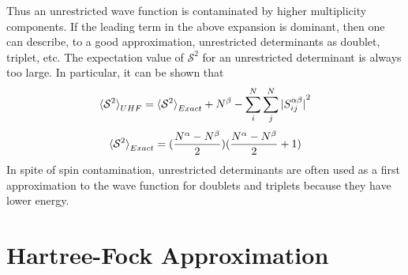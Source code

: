\documentclass[11pt]{article}
\begin{document}
Thus an unrestricted wave function is contaminated by higher multiplicity components. If the leading term in the above expansion is dominant, then
one can describe, to a good approximation, unrestricted determinants as doublet, triplet, etc. The expectation value of $\mathcal{S}^2$ for an unrestricted
determinant is always too large. In particular, it can be shown that
\begin{equation}
    \braket{\mathcal{S}^2}_{UHF}=\braket{\mathcal{S}^2}_{Exact}+N^\beta-\sum_{i}^{N}\sum_{j}^{N}{\lvert S_{ij}^{\alpha\beta}\rvert}^2
\end{equation}
\begin{equation}
    \braket{\mathcal{S}^2}_{Exact}=(\frac{N^\alpha-N^\beta}{2})(\frac{N^\alpha-N^\beta}{2}+1)
\end{equation}
In spite of spin contamination, unrestricted determinants are often used as a first approximation to the wave function for doublets and triplets because they
have lower energy.
\section{Hartree-Fock Approximation}\
\end{document}
